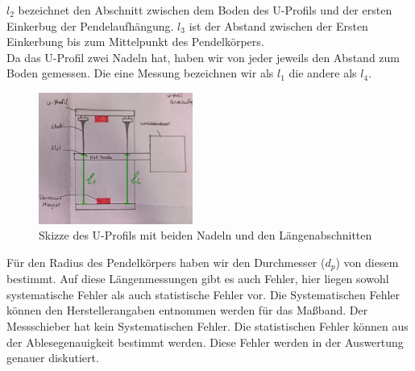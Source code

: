 \documentclass[twoside]{protokoll}
\begin{document}
$l_2$ bezeichnet den Abschnitt zwischen dem Boden des U-Profils und der ersten Einkerbug der Pendelaufhängung.
$l_3$ ist der Abstand zwischen der Ersten Einkerbung bis zum Mittelpunkt des Pendelkörpers.\\ 

Da das U-Profil zwei Nadeln hat, haben wir von jeder jeweils den Abstand zum Boden gemessen. 
Die eine Messung bezeichnen wir als $l_1$ die andere als $l_4$.
\begin{figure}[H]
    \centering
    \includegraphics[width=0.45\textwidth]{Bilder/auflage-pende-L.pdf}
    \caption{Skizze des U-Profils mit beiden Nadeln und den Längenabschnitten}
\end{figure}

Für den Radius des Pendelkörpers haben wir den Durchmesser ($d_p$) von diesem bestimmt.
Auf diese Längenmessungen gibt es auch Fehler, hier liegen sowohl systematische Fehler als auch statistische Fehler vor.
Die Systematischen Fehler können den Herstellerangaben entnommen werden für das Maßband. Der Messschieber hat kein Systematischen Fehler.
Die statistischen Fehler können aus der Ablesegenauigkeit bestimmt werden. Diese Fehler werden in der Auswertung genauer diskutiert. 
\end{document}
